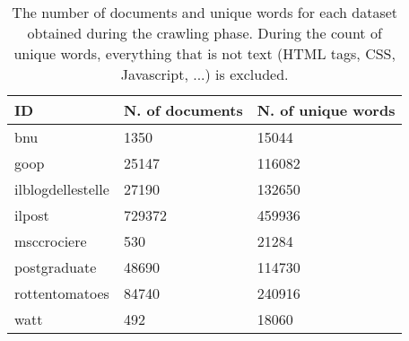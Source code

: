 \begin{table}[H]
    \begin{center}
        \begin{tabular}{ |l|l|l| }
            \hline
            ID                & N. of documents & N. of unique words \\
            \hline
            \hline
            bnu               & 1350            & 15044              \\
            \hline
            goop              & 25147           & 116082             \\
            \hline
            ilblogdellestelle & 27190           & 132650             \\
            \hline
            ilpost            & 729372          & 459936             \\
            \hline
            msccrociere       & 530             & 21284              \\
            \hline
            postgraduate      & 48690           & 114730             \\
            \hline
            rottentomatoes    & 84740           & 240916             \\
            \hline
            watt              & 492             & 18060              \\
            \hline
        \end{tabular}
    \end{center}
    \caption{
        The number of documents and unique words for each dataset obtained during the crawling phase.
        During the count of unique words, everything that is not text (HTML tags, CSS, Javascript, ...) is excluded.
    }
    \label{table:dbdata}
\end{table}